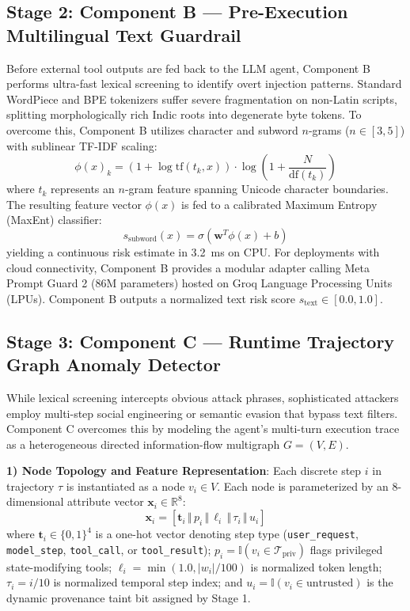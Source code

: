 \documentclass[conference]{IEEEtran}
\begin{document}
\subsection{Stage 2: Component B — Pre-Execution Multilingual Text Guardrail}
Before external tool outputs are fed back to the LLM agent, Component B performs ultra-fast lexical screening to identify overt injection patterns. Standard WordPiece and BPE tokenizers suffer severe fragmentation on non-Latin scripts, splitting morphologically rich Indic roots into degenerate byte tokens. To overcome this, Component B utilizes character and subword $n$-grams ($n \in [3, 5]$) with sublinear TF-IDF scaling:
\begin{equation}
    \phi(x)_k = \left(1 + \log \text{tf}(t_k, x)\right) \cdot \log\left(1 + \frac{N}{\text{df}(t_k)}\right)
\end{equation}
where $t_k$ represents an $n$-gram feature spanning Unicode character boundaries. The resulting feature vector $\phi(x)$ is fed to a calibrated Maximum Entropy (MaxEnt) classifier:
\begin{equation}
    s_{\text{subword}}(x) = \sigma\left(\mathbf{w}^T \phi(x) + b\right)
\end{equation}
yielding a continuous risk estimate in 3.2~ms on CPU. For deployments with cloud connectivity, Component B provides a modular adapter calling Meta Prompt Guard 2 (86M parameters) hosted on Groq Language Processing Units (LPUs). Component B outputs a normalized text risk score $s_{\text{text}} \in [0.0, 1.0]$.

\subsection{Stage 3: Component C — Runtime Trajectory Graph Anomaly Detector}
While lexical screening intercepts obvious attack phrases, sophisticated attackers employ multi-step social engineering or semantic evasion that bypass text filters. Component C overcomes this by modeling the agent's multi-turn execution trace as a heterogeneous directed information-flow multigraph $G = (V, E)$.

\textbf{1) Node Topology and Feature Representation}: Each discrete step $i$ in trajectory $\tau$ is instantiated as a node $v_i \in V$. Each node is parameterized by an 8-dimensional attribute vector $\mathbf{x}_i \in \mathbb{R}^8$:
\begin{equation}
    \mathbf{x}_i = \left[ \mathbf{t}_i \,\Vert\, p_i \,\Vert\, \ell_i \,\Vert\, \tau_i \,\Vert\, u_i \right]
\end{equation}
where $\mathbf{t}_i \in \{0, 1\}^4$ is a one-hot vector denoting step type (\texttt{user\_request}, \texttt{model\_step}, \texttt{tool\_call}, or \texttt{tool\_result}); $p_i = \mathbb{I}(v_i \in \mathcal{T}_{\text{priv}})$ flags privileged state-modifying tools; $\ell_i = \min(1.0, |w_i| / 100)$ is normalized token length; $\tau_i = i / 10$ is normalized temporal step index; and $u_i = \mathbb{I}(v_i \in \text{untrusted})$ is the dynamic provenance taint bit assigned by Stage 1.
\end{document}
